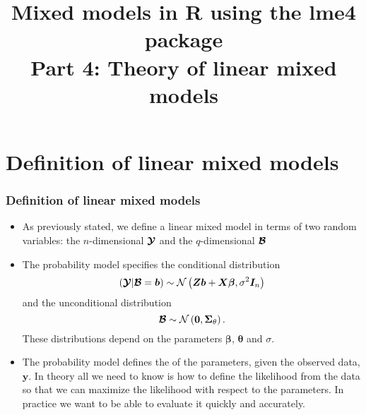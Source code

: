\documentclass[dvipsnames,pdflatex,beamer]{beamer}
\title[Theory of LMMs]{Mixed models in R using the lme4 package\\Part 4: Theory of linear mixed models}
\begin{document}

\section[Definition]{Definition of linear mixed models}

\begin{frame}
  \frametitle{Definition of linear mixed models}
  \begin{itemize}
  \item As previously stated, we define a linear mixed model in terms
    of two random variables: the $n$-dimensional $\bm{\mathcal{Y}}$ and the
    $q$-dimensional $\bm{\mathcal{B}}$
  \item The probability model specifies the conditional distribution
    \begin{displaymath}
      \left(\bm{\mathcal{Y}}|\bm{\mathcal{B}}=\bm b\right)\sim
        \mathcal{N}\left(\bm Z\bm b+\bm X\bm\beta,\sigma^2\bm I_n\right)
    \end{displaymath}
    and the unconditional distribution
    \begin{displaymath}
      \bm{\mathcal{B}}\sim\mathcal{N}\left(\bm 0,\bm\Sigma_\theta\right) .
    \end{displaymath}
    These distributions depend on the parameters $\bm\beta$,
    $\bm\theta$ and $\sigma$.
  \item The probability model defines the  of the
    parameters, given the observed data, $\bm y$.  In theory all we
    need to know is how to define the likelihood from the data so that
    we can maximize the likelihood with respect to the parameters.  In
    practice we want to be able to evaluate it quickly and accurately.
  \end{itemize}
\end{frame}
\end{document}
